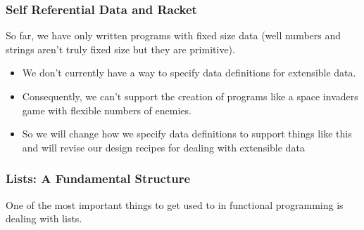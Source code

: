 \documentclass{beamer}
\begin{document}
\begin{frame}
  \frametitle{Self Referential Data and Racket}
  So far, we have only written programs with fixed size data (well numbers and strings aren't truly fixed size but they are primitive).
  \begin{itemize}
  \item<2-> We don't currently have a way to specify data definitions for extensible data.
  \item<3-> Consequently, we can't support the creation of programs like a space invaders game with
    flexible numbers of enemies.
  \item<4-> So we will change how we specify data definitions to support things like this and will revise our design recipes
    for dealing with extensible data
  \end{itemize}
\end{frame}

\begin{frame}
  \frametitle{Lists: A Fundamental Structure }
  One of the most important things to get used to in functional programming is dealing with lists.
  
\end{frame}
\end{document}
